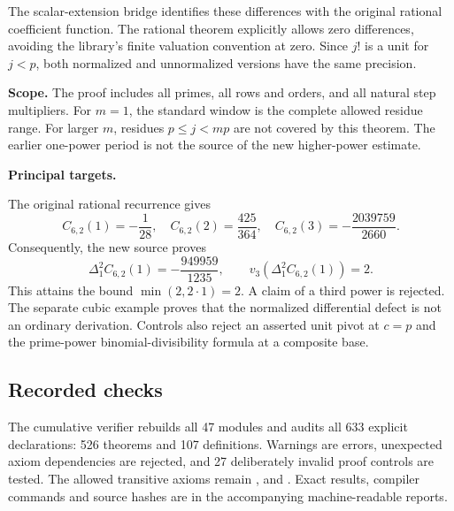 The scalar-extension bridge identifies these differences with the original rational coefficient function. The rational theorem explicitly allows zero differences, avoiding the library's finite valuation convention at zero. Since $j!$ is a unit for $j<p$, both normalized and unnormalized versions have the same precision.

\textbf{Scope.} The proof includes all primes, all rows and orders, and all natural step multipliers. For $m=1$, the standard window is the complete allowed residue range. For larger $m$, residues $p\le j<mp$ are not covered by this theorem. The earlier one-power period is not the source of the new higher-power estimate.

\textbf{Principal targets.}\par
{}\par
{}\par
{}\par
{}\par
{}

\par\medskip
{}
The original rational recurrence gives
\[
 C_{6,2}(1)=-\frac1{28},\quad C_{6,2}(2)=\frac{425}{364},\quad
 C_{6,2}(3)=-\frac{2039759}{2660}.
\]
Consequently, the new source proves
\[
 \Delta_1^2 C_{6,2}(1)=-\frac{949959}{1235},\qquad
 v_3\!\left(\Delta_1^2 C_{6,2}(1)\right)=2.
\]
This attains the bound $\min(2,2\cdot1)=2$. A claim of a third power is rejected. The separate cubic example proves that the normalized differential defect is not an ordinary derivation. Controls also reject an asserted unit pivot at $c=p$ and the prime-power binomial-divisibility formula at a composite base.

\subsection*{Recorded checks}
The cumulative verifier rebuilds all 47 modules and audits all 633 explicit declarations: 526 theorems and 107 definitions. Warnings are errors, unexpected axiom dependencies are rejected, and 27 deliberately invalid proof controls are tested. The allowed transitive axioms remain ,  and . Exact results, compiler commands and source hashes are in the accompanying machine-readable reports.

